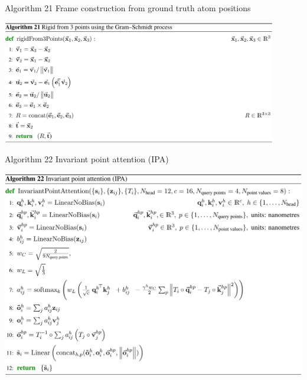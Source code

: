 \documentclass[presentation, smaller]{beamer}
\begin{document}
\begin{frame}[label={sec:org838c7f4}]{Algorithm 21 Frame construction from ground truth atom positions \cite{jumperHighlyAccurateProtein2021}}
\begin{center}
\includegraphics[width=0.9\textwidth]{./imgs/algo21_gram_schmidt.png}
\end{center}
\end{frame}
\begin{frame}[label={sec:org0923eb0}]{Algorithm 22 Invariant point attention (IPA) \cite{jumperHighlyAccurateProtein2021}}
\begin{center}
\includegraphics[height=0.9\textheight]{./imgs/algo22_ipa.png}
\end{center}
\end{frame}
\end{document}
